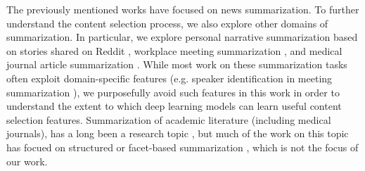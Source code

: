 The previously mentioned works have
focused on news summarization. To further
understand the content selection process, we also explore other domains 
of summarization. In particular, we explore 
personal narrative summarization based on stories shared
on Reddit \cite{ouyang2017crowd}, workplace meeting summarization
\cite{carletta2005ami}, and medical journal article summarization 
\cite{mishra2014text}. While most work on these summarization tasks
 often exploit domain-specific features (e.g. speaker identification in meeting summarization \cite{galley2006skip,gillick2009global}),
we purposefully avoid such features in this work in order to understand 
the extent to which deep learning models can learn useful content 
selection features.
Summarization of academic literature (including medical journals), has a long 
been a research topic
\cite{kupiec1995trainable,elhadad2005customization}, but much of the work on this topic has
focued on structured or facet-based summarization \cite{jaidka2017insights}, which is not the focus of our work.












%
%
%
%



